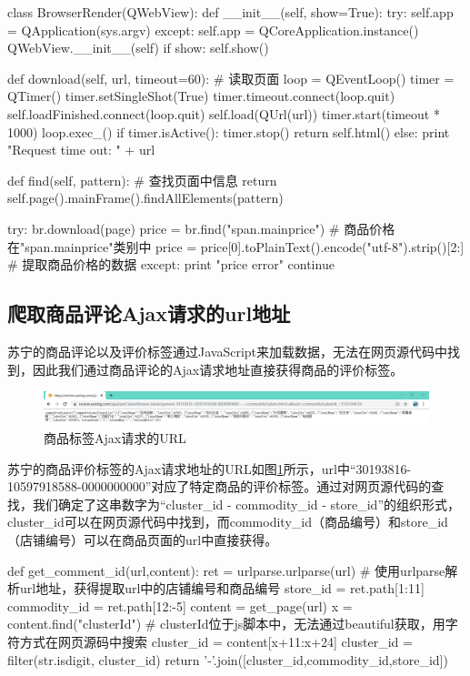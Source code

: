 \begin{python}
class BrowserRender(QWebView):
    def __init__(self, show=True):
        try:
            self.app = QApplication(sys.argv)
        except:
            self.app = QCoreApplication.instance()
        QWebView.__init__(self)
        if show:
            self.show()

    def download(self, url, timeout=60): # 读取页面
        loop = QEventLoop()
        timer = QTimer()
        timer.setSingleShot(True)
        timer.timeout.connect(loop.quit)
        self.loadFinished.connect(loop.quit)
        self.load(QUrl(url))
        timer.start(timeout * 1000)
        loop.exec_()
        if timer.isActive():
            timer.stop()
            return self.html()
        else:
            print "Request time out: " + url

    def find(self, pattern): # 查找页面中信息
       return self.page().mainFrame().findAllElements(pattern)

try:
    br.download(page)
    price = br.find("span.mainprice") # 商品价格在"span.mainprice"类别中
    price = price[0].toPlainText().encode("utf-8").strip()[2:] # 提取商品价格的数据
except:
    print "price error"
    continue
\end{python}

\subsection{爬取商品评论Ajax请求的url地址}

苏宁的商品评论以及评价标签通过JavaScript来加载数据，无法在网页源代码中找到，因此我们通过商品评论的Ajax请求地址直接获得商品的评价标签。

\begin{figure}[htbp]
\centering
\includegraphics[width=13.5cm]{img/fsh/1.jpg}
\caption{商品标签Ajax请求的URL}
\label{fig:fsh_crawler}
\end{figure}

苏宁的商品评价标签的Ajax请求地址的URL如图\ref{fig:fsh_crawler}所示，url中“30193816-10597918588-0000000000”对应了特定商品的评价标签。通过对网页源代码的查找，我们确定了这串数字为“cluster_id - commodity_id - store_id”的组织形式，cluster_id可以在网页源代码中找到，而commodity_id（商品编号）和store_id（店铺编号）可以在商品页面的url中直接获得。


\begin{python}
def get_comment_id(url,content):
    ret = urlparse.urlparse(url) # 使用urlparse解析url地址，获得提取url中的店铺编号和商品编号
    store_id = ret.path[1:11]
    commodity_id = ret.path[12:-5]
    content = get_page(url)
    x = content.find("clusterId") # clusterId位于js脚本中，无法通过beautiful获取，用字符方式在网页源码中搜索
    cluster_id = content[x+11:x+24]
    cluster_id = filter(str.isdigit, cluster_id)
    return '-'.join([cluster_id,commodity_id,store_id])
\end{python}